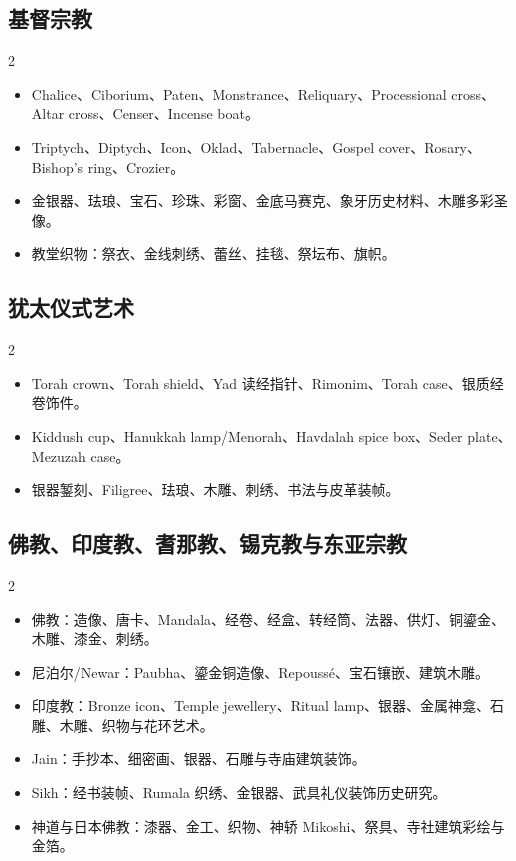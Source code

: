 \documentclass[lang=en,a4paper,11pt]{elegantpaper}
\begin{document}
\subsection{基督宗教}
\begin{multicols}{2}\begin{itemize}
\item Chalice、Ciborium、Paten、Monstrance、Reliquary、Processional cross、Altar cross、Censer、Incense boat。
\item Triptych、Diptych、Icon、Oklad、Tabernacle、Gospel cover、Rosary、Bishop's ring、Crozier。
\item 金银器、珐琅、宝石、珍珠、彩窗、金底马赛克、象牙历史材料、木雕多彩圣像。
\item 教堂织物：祭衣、金线刺绣、蕾丝、挂毯、祭坛布、旗帜。
\end{itemize}\end{multicols}
\subsection{犹太仪式艺术}
\begin{multicols}{2}\begin{itemize}
\item Torah crown、Torah shield、Yad 读经指针、Rimonim、Torah case、银质经卷饰件。
\item Kiddush cup、Hanukkah lamp/Menorah、Havdalah spice box、Seder plate、Mezuzah case。
\item 银器錾刻、Filigree、珐琅、木雕、刺绣、书法与皮革装帧。
\end{itemize}\end{multicols}
\subsection{佛教、印度教、耆那教、锡克教与东亚宗教}
\begin{multicols}{2}\begin{itemize}
\item 佛教：造像、唐卡、Mandala、经卷、经盒、转经筒、法器、供灯、铜鎏金、木雕、漆金、刺绣。
\item 尼泊尔/Newar：Paubha、鎏金铜造像、Repoussé、宝石镶嵌、建筑木雕。
\item 印度教：Bronze icon、Temple jewellery、Ritual lamp、银器、金属神龛、石雕、木雕、织物与花环艺术。
\item Jain：手抄本、细密画、银器、石雕与寺庙建筑装饰。
\item Sikh：经书装帧、Rumala 织绣、金银器、武具礼仪装饰历史研究。
\item 神道与日本佛教：漆器、金工、织物、神轿 Mikoshi、祭具、寺社建筑彩绘与金箔。
\end{itemize}\end{multicols}
\end{document}
